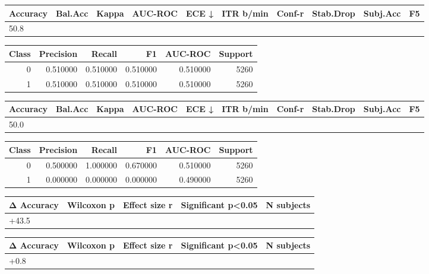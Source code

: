 \begin{tabular}{llrrrrrlll}
\toprule
Accuracy & Bal.Acc & Kappa & AUC-ROC & ECE ↓ & ITR b/min & Conf-r & Stab.Drop & Subj.Acc & F5 \\
\midrule
50.8%
\bottomrule
\end{tabular}


\begin{tabular}{rrrrrr}
\toprule
Class & Precision & Recall & F1 & AUC-ROC & Support \\
\midrule
0 & 0.510000 & 0.510000 & 0.510000 & 0.510000 & 5260 \\
1 & 0.510000 & 0.510000 & 0.510000 & 0.510000 & 5260 \\
\bottomrule
\end{tabular}


\begin{tabular}{llrrrrrlll}
\toprule
Accuracy & Bal.Acc & Kappa & AUC-ROC & ECE ↓ & ITR b/min & Conf-r & Stab.Drop & Subj.Acc & F5 \\
\midrule
50.0%
\bottomrule
\end{tabular}


\begin{tabular}{rrrrrr}
\toprule
Class & Precision & Recall & F1 & AUC-ROC & Support \\
\midrule
0 & 0.500000 & 1.000000 & 0.670000 & 0.510000 & 5260 \\
1 & 0.000000 & 0.000000 & 0.000000 & 0.490000 & 5260 \\
\bottomrule
\end{tabular}


\begin{tabular}{lrrll}
\toprule
Δ Accuracy & Wilcoxon p & Effect size r & Significant p<0.05 & N subjects \\
\midrule
+43.5%
\bottomrule
\end{tabular}


\begin{tabular}{lrrll}
\toprule
Δ Accuracy & Wilcoxon p & Effect size r & Significant p<0.05 & N subjects \\
\midrule
+0.8%
\bottomrule
\end{tabular}


